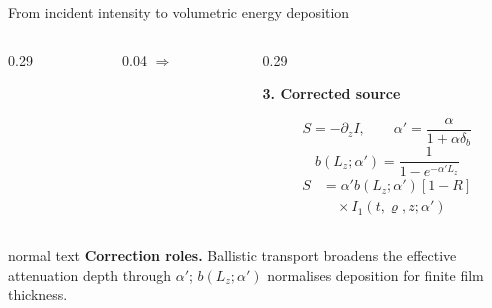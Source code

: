 \documentclass[aspectratio=169,10pt]{beamer}
\begin{document}
\begin{frame}[t]{From incident intensity to volumetric energy deposition}
\begin{columns}[T,onlytextwidth]
\begin{column}{0.29\textwidth}
    \end{column}
    \begin{column}{0.04\textwidth}
      \centering\vspace{0.82cm}\textcolor{GVTeal}{\(\Longrightarrow\)}
    \end{column}
    \begin{column}{0.29\textwidth}
      \raggedright\scriptsize\textbf{\color{GVSourceBlue}3. Corrected source}\par
      \vspace{0.11cm}
      \[
      S=-\partial_z I,\qquad
      \alpha'=\frac{\alpha}{1+\alpha\delta_b}
      \]
      \vspace{-0.21cm}
      \[
      b(L_z;\alpha')=\frac{1}{1-e^{-\alpha'L_z}}
      \]
      \vspace{-0.18cm}
      \[
      \begin{aligned}
      S&=\alpha'b(L_z;\alpha')[1-R]\\[-0.05cm]
      &\quad\times I_1(t,\varrho,z;\alpha')
      \end{aligned}
      \]
    \end{column}
  \end{columns}
  \vspace{0.19cm}
  \begin{beamercolorbox}[wd=0.90\textwidth,sep=0.24em]{normal text}
    \scriptsize\textbf{\color{GVTeal}Correction roles.} Ballistic transport broadens the effective attenuation depth through \(\alpha'\); \(b(L_z;\alpha')\) normalises deposition for finite film thickness.
  \end{beamercolorbox}
\end{frame}
\end{document}
